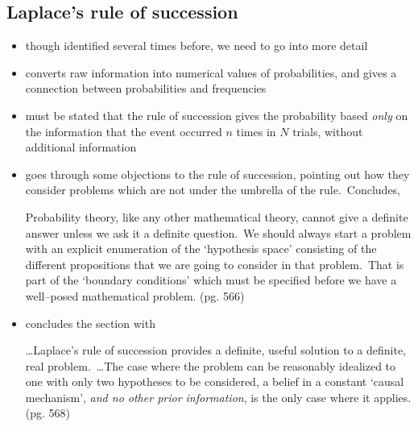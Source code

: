 \documentclass[../jaynes_prob_theory_notes.tex]{subfiles}
\begin{document}
        \subsection{Laplace's rule of succession}
            \begin{itemize} 
                \item though identified several times before, we need to go into more detail
                \item converts raw information into numerical values of probabilities, and gives a connection between probabilities and frequencies
                \item must be stated that the rule of succession gives the probability based \textit{only} on the information that the event occurred \(n\) times in \(N\) trials, without additional information
                \item goes through some objections to the rule of succession, pointing out how they consider problems which are not under the umbrella of the rule.\ Concludes,
                    \begin{displayquote} 
                        Probability theory, like any other mathematical theory, cannot give a definite answer unless we ask it a definite question.\ We should always start a problem with an explicit enumeration of the `hypothesis space' consisting of the different propositions that we are going to consider in that problem.\ That is part of the `boundary conditions' which must be specified before we have a well--posed mathematical problem. (pg. 566)
                    \end{displayquote}
                \item concludes the section with
                    \begin{displayquote} 
                        \ldots Laplace's rule of succession provides a definite, useful solution to a definite, real problem.~\ldots The case where the problem can be reasonably idealized to one with only two hypotheses to be considered, a belief in a constant `causal mechanism', \textit{and no other prior information}, is the only case where it applies. (pg. 568) 
                    \end{displayquote}
            \end{itemize}
\end{document}
